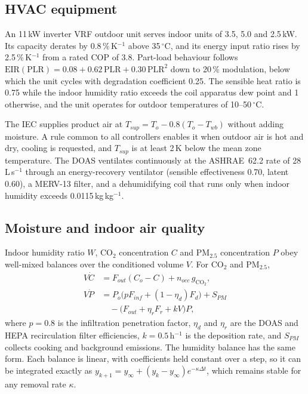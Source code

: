 \subsection{HVAC equipment}
An 11\,kW inverter VRF outdoor unit serves indoor units of 3.5, 5.0 and 2.5\,kW. Its
capacity derates by 0.8\,\%\,K$^{-1}$ above 35\,$^\circ$C, and its energy input ratio
rises by 2.5\,\%\,K$^{-1}$ from a rated COP of 3.8. Part-load behaviour follows
$\mathrm{EIR}(\mathrm{PLR})=0.08+0.62\,\mathrm{PLR}+0.30\,\mathrm{PLR}^2$ down to
20\,\% modulation, below which the unit cycles with degradation coefficient 0.25. The
sensible heat ratio is 0.75 while the indoor humidity ratio exceeds the coil apparatus
dew point and 1 otherwise, and the unit operates for outdoor temperatures of
10--50\,$^\circ$C.

The IEC supplies product air at $T_{sup}=T_o-0.8(T_o-T_{wb})$ without adding moisture.
A rule common to all controllers enables it when outdoor air is hot and dry, cooling is
requested, and $T_{sup}$ is at least 2\,K below the mean zone temperature. The DOAS
ventilates continuously at the ASHRAE~62.2 rate of 28\,L\,s$^{-1}$ \cite{ashrae622}
through an energy-recovery ventilator (sensible effectiveness 0.70, latent 0.60), a
MERV-13 filter, and a dehumidifying coil that runs only when indoor humidity exceeds
0.0115\,kg\,kg$^{-1}$.

\subsection{Moisture and indoor air quality}
Indoor humidity ratio $W$, CO$_2$ concentration $C$ and PM$_{2.5}$ concentration $P$
obey well-mixed balances over the conditioned volume $V$. For CO$_2$ and PM$_{2.5}$,
\begin{align}
V\dot C &= F_{out}(C_o-C)+n_{occ}\,g_{\mathrm{CO_2}},\label{eq:co2}\\
V\dot P &= P_o\big(pF_{inf}+(1-\eta_d)F_d\big) + S_{PM} \nonumber\\
        &\quad -\big(F_{out}+\eta_r F_r+kV\big)P, \label{eq:pm}
\end{align}
where $p=0.8$ is the infiltration penetration factor, $\eta_d$ and $\eta_r$ are the
DOAS and HEPA recirculation filter efficiencies, $k=0.5$\,h$^{-1}$ is the deposition
rate, and $S_{PM}$ collects cooking and background emissions. The humidity balance has
the same form. Each balance is linear, with coefficients held constant over a step, so it
can be integrated exactly as $y_{k+1}=y_\infty+(y_k-y_\infty)e^{-\kappa\Delta t}$, which remains
stable for any removal rate $\kappa$.

